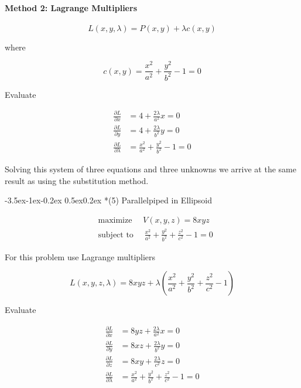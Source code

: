 \documentclass[11pt,letterpaper,onecolumn,notitlepage]{article}
\makeatletter
\renewcommand\subsection{\@startsection{subsection}{1}{\z@}%
{-3.5ex\@plus-1ex\@minus-0.2ex}%
{0.5ex\@plus0.2ex}%
{\fontsize{10pt}{10pt}\selectfont\bfseries\sffamily}}
\makeatother
\begin{document}
  \paragraph{Method 2: Lagrange Multipliers}

  \begin{equation*}
    L(x,y,\lambda)=P(x,y)+\lambda c(x,y)
  \end{equation*}

  where

  \begin{equation*}
    c(x,y)=\frac{x^{2}}{a^{2}}+\frac{y^{2}}{b^{2}}-1=0
  \end{equation*}

  Evaluate

  \begin{align*}
    \frac{\partial L}{\partial x}      &= 4+\frac{2\lambda}{a^{2}}x=0 \\
    \frac{\partial L}{\partial y}      &= 4+\frac{2\lambda}{b^{2}}y=0 \\
    \frac{\partial L}{\partial\lambda} &= \frac{x^{2}}{a^{2}}+\frac{y^{2}}{b^{2}}-1=0
  \end{align*}

  Solving this system of three equations and three unknowns we arrive at the same result as using the substitution method.

  \subsection*{(5) Parallelpiped in Ellipsoid}

  \begin{align*}
    &\text{maximize }\quad V(x,y,z)=8xyz \\
    &\text{subject to }\quad\frac{x^{2}}{a^{2}}+\frac{y^{2}}{b^{2}}+\frac{z^{2}}{c^{2}}-1=0
  \end{align*}

  For this problem use Lagrange multipliers

  \begin{equation*}
    L(x,y,z,\lambda)=8xyz+\lambda\left(\frac{x^{2}}{a^{2}}+\frac{y^{2}}{b^{2}}+\frac{z^{2}}{c^{2}}-1\right)
  \end{equation*}

  Evaluate

  \begin{align*}
    \frac{\partial L}{\partial x}      &= 8yz+\frac{2\lambda}{a^{2}}x=0 \\
    \frac{\partial L}{\partial y}      &= 8xz+\frac{2\lambda}{b^{2}}y=0 \\
    \frac{\partial L}{\partial z}      &= 8xy+\frac{2\lambda}{c^{2}}z=0 \\
    \frac{\partial L}{\partial\lambda} &= \frac{x^{2}}{a^{2}}+\frac{y^{2}}{b^{2}}+\frac{z^{2}}{c^{2}}-1=0
  \end{align*}
\end{document}
